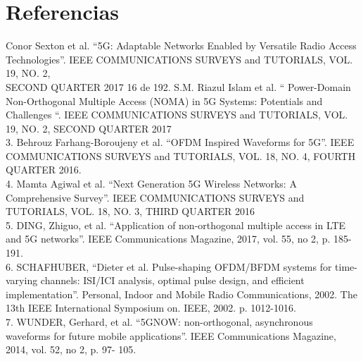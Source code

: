\documentclass[]{article}
\begin{document}
\section{Referencias}


Conor Sexton et al. “5G: Adaptable Networks Enabled by Versatile Radio Access
Technologies”. IEEE COMMUNICATIONS SURVEYS and TUTORIALS, VOL. 19, NO. 2,\\

SECOND QUARTER 2017
16 de 192. S.M. Riazul Islam et al. “ Power-Domain Non-Orthogonal Multiple Access (NOMA) in
5G Systems: Potentials and Challenges “. IEEE COMMUNICATIONS SURVEYS and
TUTORIALS, VOL. 19, NO. 2, SECOND QUARTER 2017\\

3. Behrouz Farhang-Boroujeny et al. “OFDM Inspired Waveforms for 5G”. IEEE
COMMUNICATIONS SURVEYS and TUTORIALS, VOL. 18, NO. 4, FOURTH QUARTER 2016.\\

4. Mamta Agiwal et al. “Next Generation 5G Wireless Networks: A Comprehensive
Survey”. IEEE COMMUNICATIONS SURVEYS and TUTORIALS, VOL. 18, NO. 3, THIRD
QUARTER 2016\\

5. DING, Zhiguo, et al. “Application of non-orthogonal multiple access in LTE and 5G
networks”. IEEE Communications Magazine, 2017, vol. 55, no 2, p. 185-191.\\

6. SCHAFHUBER, “Dieter et al. Pulse-shaping OFDM/BFDM systems for time-varying
channels: ISI/ICI analysis, optimal pulse design, and efficient implementation”.
Personal, Indoor and Mobile Radio Communications, 2002. The 13th IEEE International
Symposium on. IEEE, 2002. p. 1012-1016.\\

7. WUNDER, Gerhard, et al. “5GNOW: non-orthogonal, asynchronous waveforms for
future mobile applications”. IEEE Communications Magazine, 2014, vol. 52, no 2, p. 97-
105.\\



%
%
\end{document}
